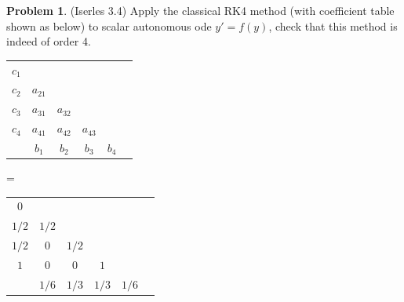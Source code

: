 \documentclass[a4paper, 10pt]{article}
\theoremstyle{definition}
\newtheorem{problem}{Problem}
\theoremstyle{hSol}
\begin{document}
\begin{problem} (Iserles 3.4) Apply the classical RK4 method (with coefficient table shown as below) to scalar autonomous ode $y'=f(y)$, check that this method is indeed of order 4.
  \begin{center}
    \begin{tabular}{c|ccccc}
    $c_1$ \\
    $c_2$ & $a_{21}$ \\
    $c_3$ & $a_{31}$ & $a_{32}$\\
    $c_4$ & $a_{41}$ & $a_{42}$ & $a_{43}$\\
    \hline
     & $b_1$ & $b_2$ & $b_3$ & $b_4$
    \end{tabular}  = 
    \begin{tabular}{c|ccccc}
    $0$ \\
    $1/2$ & $1/2$ \\
    $1/2$ & $0$ & $1/2$\\
    $1$ & $0$ & $0$ & $1$\\
    \hline
     & $1/6$ & $1/3$ & $1/3$ & $1/6$
    \end{tabular}
  \end{center}
\end{problem}
\end{document}
